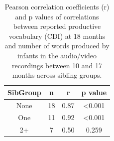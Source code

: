\documentclass[
  man,mask,floatsintext]{apa6}
\begin{document}
\begin{longtable}[t]{cccc}
\caption{\label{tab:production-corrs}Pearson correlation coefficients (r) and p values of correlations between reported productive vocabulary (CDI) at 18 months and number of words produced by infants in the audio/video recordings between 10 and 17 months across sibling groups.}\\
\toprule
SibGroup & n & r & p value\\
\midrule
None & 18 & 0.87 & <0.001\\
One & 11 & 0.92 & <0.001\\
2+ & 7 & 0.50 & 0.259\\
\bottomrule
\end{longtable}
\end{document}
